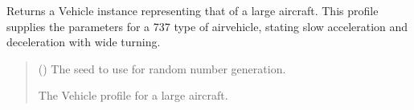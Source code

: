 \documentclass[letterpaper,10pt,english]{sphinxmanual}
\begin{document}
\begin{fulllineitems}
\label{\detokenize{modules/waypoints/vehicle:qnav.waypoints.vehicle.get_large_aircraft_profile}}
\pysigstartsignatures
{}
\pysigstopsignatures
\sphinxAtStartPar
Returns a Vehicle instance representing that of a large aircraft.
This profile supplies the parameters for a 737 type of air\sphinxhyphen{}vehicle,
stating slow acceleration and deceleration with wide turning.
\begin{quote}\begin{description}
\sphinxAtStartPar
{} () \textendash{} The seed to use for random number generation.

\sphinxAtStartPar
The Vehicle profile for a large aircraft.

\sphinxAtStartPar
{\hyperref[\detokenize{modules/waypoints/vehicle:qnav.waypoints.vehicle.Vehicle}]{}}

\end{description}\end{quote}

\end{fulllineitems}

\end{document}
